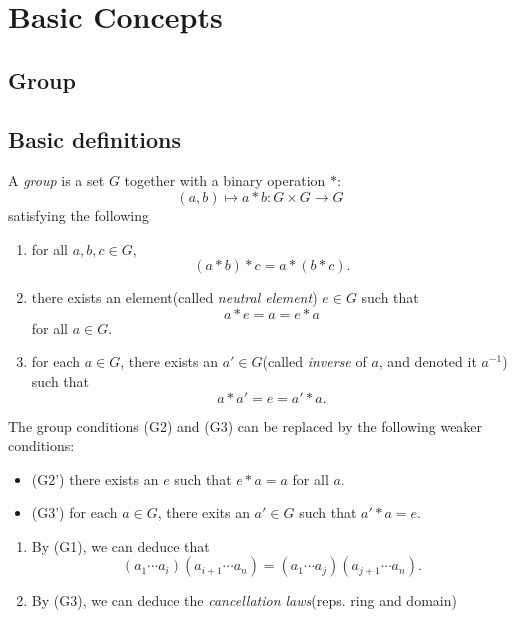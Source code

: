 \chapter{Basic Concepts}
\section{Group}
\section{Basic definitions}
\begin{definition}
  A \emph{group} is a set \( G \) together with a binary operation \( * \):
  \[
    (a, b) \mapsto a * b: G \times G \to G
  \]
  satisfying the following
  \begin{enumerate}[label=(G\arabic*)]
    \item for all \( a, b, c \in G \),
      \[
        (a * b) * c = a * (b * c).
      \]
    \item there exists an element(called \emph{neutral element}) \( e \in G \) such that
      \[
        a * e = a = e * a
      \]
      for all \( a \in G \).
    \item for each \( a \in G \), there exists an \( a' \in G \)(called \emph{inverse} of \( a \), and denoted it \( a^{-1} \)) such that
      \[
         a * a' = e = a' * a.
      \]
  \end{enumerate}
\end{definition}
\begin{remark}
  The group conditions (G2) and (G3) can be replaced by the following weaker
  conditions:
  \begin{itemize}
    \item (G2') there exists an \( e \) such that \( e * a = a \) for all \( a
      \).
    \item (G3') for each \( a \in G \), there exits an \( a' \in G \) such that
      \( a' * a = e \).
  \end{itemize}
\end{remark}

\begin{remark}
  \begin{enumerate}
    \item By (G1), we can deduce that
      \[
        (a_1 \cdots a_i)(a_{i + 1}\cdots a_n) =
        (a_1 \cdots a_j) (a_{j + 1} \cdots a_n).
      \]
    \item By (G3), we can deduce the \emph{cancellation laws}(reps. ring and
      domain)
  \end{enumerate}
\end{remark}

